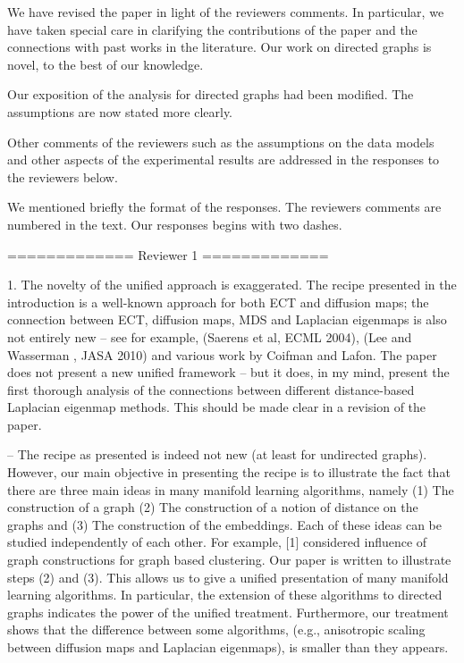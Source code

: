 We have revised the paper in light of the reviewers comments. In
particular, we have taken special care in clarifying the contributions
of the paper and the connections with past works in the
literature. Our work on directed graphs is novel, to the best of our
knowledge.

Our exposition of the analysis for directed graphs had been
modified. The assumptions are now stated more clearly. 

Other comments of the reviewers such as the assumptions on the data
models and other aspects of the experimental results are addressed in
the responses to the reviewers below. 

We mentioned briefly the format of the responses. The reviewers comments are
numbered in the text. Our responses begins with two dashes. 

============= Reviewer 1 ============= 

1. The novelty of the unified approach is exaggerated. The recipe
presented in the introduction is a well-known approach for both ECT
and diffusion maps; the connection between ECT, diffusion maps, MDS
and Laplacian eigenmaps is also not entirely new -- see for example,
(Saerens et al, ECML 2004), (Lee and Wasserman , JASA 2010) and
various work by Coifman and Lafon. The paper does not present a new
unified framework -- but it does, in my mind, present the first
thorough analysis of the connections between different distance-based
Laplacian eigenmap methods. This should be made clear in a revision of
the paper.

-- The recipe as presented is indeed not new (at least for undirected
graphs). However, our main objective in presenting the recipe is to
illustrate the fact that there are three main ideas in many manifold
learning algorithms, namely (1) The construction of a graph (2) The
construction of a notion of distance on the graphs and (3) The
construction of the embeddings. Each of these ideas can be studied
independently of each other. For example, [1] considered influence of
graph constructions for graph based clustering. Our paper is written
to illustrate steps (2) and (3). This allows us to give a unified
presentation of many manifold learning algorithms. In particular, the
extension of these algorithms to directed graphs
indicates the power of the unified treatment. Furthermore, our
treatment shows that the difference between some algorithms, (e.g.,
anisotropic scaling between diffusion maps and Laplacian eigenmaps),
is smaller than they appears.
 
